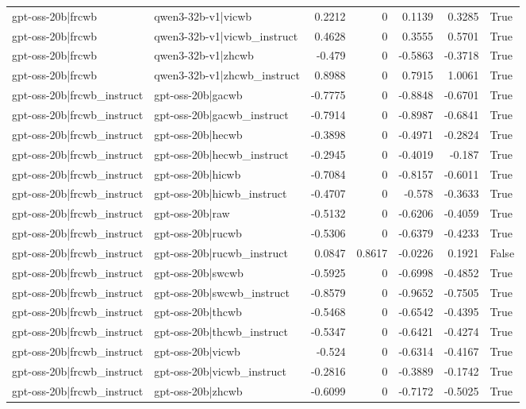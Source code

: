 \begin{table}
\begin{tabular}{l l r r r r l}
gpt-oss-20b|frcwb & qwen3-32b-v1|vicwb & 0.2212 & 0 & 0.1139 & 0.3285 & True \\
gpt-oss-20b|frcwb & qwen3-32b-v1|vicwb_instruct & 0.4628 & 0 & 0.3555 & 0.5701 & True \\
gpt-oss-20b|frcwb & qwen3-32b-v1|zhcwb & -0.479 & 0 & -0.5863 & -0.3718 & True \\
gpt-oss-20b|frcwb & qwen3-32b-v1|zhcwb_instruct & 0.8988 & 0 & 0.7915 & 1.0061 & True \\
gpt-oss-20b|frcwb_instruct & gpt-oss-20b|gacwb & -0.7775 & 0 & -0.8848 & -0.6701 & True \\
gpt-oss-20b|frcwb_instruct & gpt-oss-20b|gacwb_instruct & -0.7914 & 0 & -0.8987 & -0.6841 & True \\
gpt-oss-20b|frcwb_instruct & gpt-oss-20b|hecwb & -0.3898 & 0 & -0.4971 & -0.2824 & True \\
gpt-oss-20b|frcwb_instruct & gpt-oss-20b|hecwb_instruct & -0.2945 & 0 & -0.4019 & -0.187 & True \\
gpt-oss-20b|frcwb_instruct & gpt-oss-20b|hicwb & -0.7084 & 0 & -0.8157 & -0.6011 & True \\
gpt-oss-20b|frcwb_instruct & gpt-oss-20b|hicwb_instruct & -0.4707 & 0 & -0.578 & -0.3633 & True \\
gpt-oss-20b|frcwb_instruct & gpt-oss-20b|raw & -0.5132 & 0 & -0.6206 & -0.4059 & True \\
gpt-oss-20b|frcwb_instruct & gpt-oss-20b|rucwb & -0.5306 & 0 & -0.6379 & -0.4233 & True \\
gpt-oss-20b|frcwb_instruct & gpt-oss-20b|rucwb_instruct & 0.0847 & 0.8617 & -0.0226 & 0.1921 & False \\
gpt-oss-20b|frcwb_instruct & gpt-oss-20b|swcwb & -0.5925 & 0 & -0.6998 & -0.4852 & True \\
gpt-oss-20b|frcwb_instruct & gpt-oss-20b|swcwb_instruct & -0.8579 & 0 & -0.9652 & -0.7505 & True \\
gpt-oss-20b|frcwb_instruct & gpt-oss-20b|thcwb & -0.5468 & 0 & -0.6542 & -0.4395 & True \\
gpt-oss-20b|frcwb_instruct & gpt-oss-20b|thcwb_instruct & -0.5347 & 0 & -0.6421 & -0.4274 & True \\
gpt-oss-20b|frcwb_instruct & gpt-oss-20b|vicwb & -0.524 & 0 & -0.6314 & -0.4167 & True \\
gpt-oss-20b|frcwb_instruct & gpt-oss-20b|vicwb_instruct & -0.2816 & 0 & -0.3889 & -0.1742 & True \\
gpt-oss-20b|frcwb_instruct & gpt-oss-20b|zhcwb & -0.6099 & 0 & -0.7172 & -0.5025 & True \\

\end{tabular}
\end{table}
